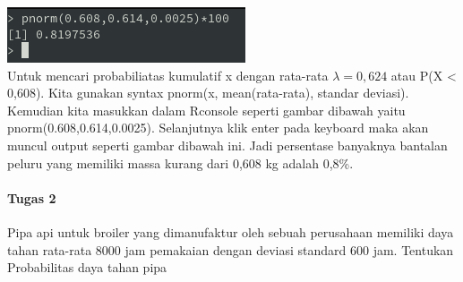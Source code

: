 \documentclass[a4paper,12pt]{article}
\begin{document}
\begin{enumerate}[label=\alph*.]
        \includegraphics{tugas1c}\\
        Untuk mencari probabiliatas kumulatif x dengan rata-rata $\lambda = 0,624$ atau P(X < 0,608). Kita gunakan syntax  pnorm(x, mean(rata-rata), standar deviasi). Kemudian kita masukkan dalam Rconsole seperti gambar dibawah yaitu pnorm(0.608,0.614,0.0025). Selanjutnya klik enter pada keyboard maka akan muncul output seperti gambar dibawah ini. Jadi persentase banyaknya bantalan peluru yang memiliki massa kurang dari 0,608 kg adalah 0,8\%.
\end{enumerate}

\paragraph{Tugas 2\\}
Pipa api untuk broiler yang dimanufaktur oleh sebuah perusahaan memiliki daya tahan rata-rata 8000 jam pemakaian dengan deviasi standard 600 jam. Tentukan Probabilitas daya tahan pipa
\end{document}

